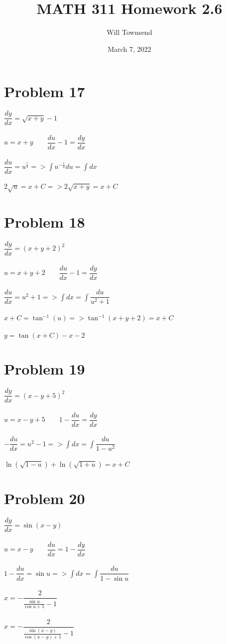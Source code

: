 \documentclass[12pt]{exam}
\title{\textbf{MATH 311 Homework 2.6}}
\author{Will Townsend}
\date{March 7, 2022}
\begin{document}
\maketitle

\section*{Problem 17}
$\dfrac{dy}{dx}=\sqrt{x+y}-1$\\\\
$u=x+y\qquad\dfrac{du}{dx}-1=\dfrac{dy}{dx}$\\\\
$\dfrac{du}{dx}=u^{\frac{1}{2}}=>\int u^{-\frac{1}{2}}du=\int dx$\\\\
$2\sqrt{u}=x+C=>2\sqrt{x+y}=x+C$
\section*{Problem 18}
$\dfrac{dy}{dx}=(x+y+2)^2$\\\\
$u=x+y+2\qquad\dfrac{du}{dx}-1=\dfrac{dy}{dx}$\\\\
$\dfrac{du}{dx}=u^2+1=>\int dx=\int\dfrac{du}{u^2+1}$\\\\
$x+C=\tan^{-1}(u)=>\tan^{-1}(x+y+2)=x+C$\\\\
$y=\tan(x+C)-x-2$
\section*{Problem 19}
$\dfrac{dy}{dx}=(x-y+5)^2$\\\\
$u=x-y+5\qquad1-\dfrac{du}{dx}=\dfrac{dy}{dx}$\\\\
$-\dfrac{du}{dx}=u^2-1=>\int dx=\int\dfrac{du}{1-u^2}$\\\\
$\ln{\left(\sqrt{1-u}\right)}+\ln{\left(\sqrt{1+u}\right)}=x+C$
\section*{Problem 20}
$\dfrac{dy}{dx}=\sin{(x-y)}$\\\\
$u=x-y\qquad\dfrac{du}{dx}=1-\dfrac{dy}{dx}$\\\\
$1-\dfrac{du}{dx}=\sin{u}=>\int dx=\int\dfrac{du}{1-\sin{u}}$\\\\
$x=-\dfrac{2}{\frac{\sin{u}}{\cos{u}+1}-1}$\\\\
$x=-\dfrac{2}{\frac{\sin{(x-y)}}{\cos{(x-y)}+1}-1}$
\end{document}
